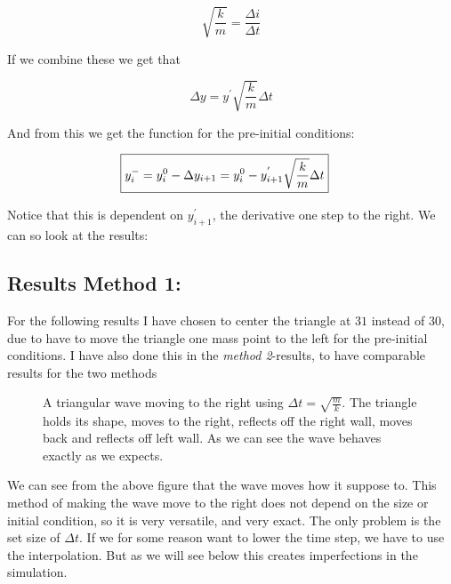\documentclass[a4paper,norsk, 10pt]{article}
\begin{document}
\begin{equation}
\sqrt{\frac{k}{m}} = \frac{\Delta i}{\Delta t}
\end{equation}

If we combine these we get that

\begin{equation}
\Delta y = y^{'}\sqrt{\frac{k}{m}}\Delta t
\end{equation}

And from this we get the function for the pre-initial conditions:

\begin{align}
\Aboxed{
y_i^- = y_{i}^0 - \Delta y_{i+1}  = y_{i}^0 - y^{'}_{i+1}\sqrt{\frac{k}{m}}\Delta t
}
\end{align}

Notice that this is dependent on $y^{'}_{i+1}$, the derivative one step to the right.
We can so look at the results:

\subsection*{Results Method 1:}

For the following results I have chosen to center the triangle at $31$ instead of $30$, due to have to move the triangle one mass point to the left for the pre-initial conditions. I have also done this in the \textit{method 2}-results, to have comparable results for the two methods

\begin{figure}[H]
\captionsetup[subfigure]{position=b}
\centering
{}
\par
{}
\caption{A triangular wave moving to the right using $\Delta t = \sqrt{\frac{m}{k}}$. The triangle holds its shape, moves to the right, reflects off the right wall, moves back and reflects off left wall. As we can see the wave behaves exactly as we expects.}
\end{figure}

We can see from the above figure that the wave moves how it suppose to. This method of making the wave move to the right does not depend on the size or initial condition, so it is very versatile, and very exact. The only problem is the set size of $\Delta t$. If we for some reason want to lower the time step, we have to use the interpolation. But as we will see below this creates imperfections in the simulation.
\end{document}
